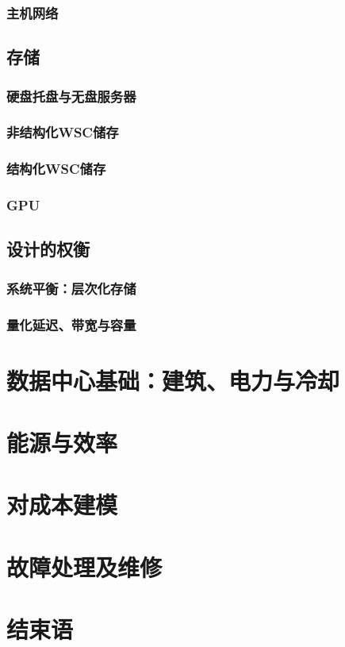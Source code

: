 \documentclass[UTF8]{ctexart}
\begin{document}
	\subsubsection{主机网络}

\subsection{存储}
	\subsubsection{硬盘托盘与无盘服务器}
	\subsubsection{非结构化WSC储存}
	\subsubsection{结构化WSC储存}
	\subsubsection{GPU}

\subsection{设计的权衡}
	\subsubsection{系统平衡：层次化存储}
	\subsubsection{量化延迟、带宽与容量}


\section{数据中心基础：建筑、电力与冷却}

\section{能源与效率}

\section{对成本建模}

\section{故障处理及维修}

\section{结束语}
\end{document}
